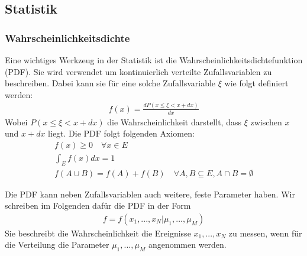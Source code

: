 \subsection{Statistik}
\subsubsection{Wahrscheinlichkeitsdichte}
Eine wichtiges Werkzeug in der Statistik ist die Wahrscheinlichkeitsdichtefunktion (PDF).
Sie wird verwendet um kontinuierlich verteilte Zufallsvariablen zu beschreiben.
Dabei kann sie für eine solche Zufallsvariable $\xi$ wie folgt definiert werden:
\begin{gather}
	f(x) = \frac{dP\left (x\leq \xi <x+dx\right )}{dx}
\end{gather}
Wobei $P\left (x\leq \xi <x+dx\right )$ die Wahrscheinlichkeit darstellt, dass $\xi$ zwischen $x$ und $x+dx$ liegt.
Die PDF folgt folgenden Axiomen:
\begin{gather}
	f(x) \geq 0 \quad \forall	x \in E \\
	\int_{E} f(x)dx = 1 \\
	f(A \cup B) = f(A) + f(B) \quad \forall A,B \subseteq E, A \cap B = \emptyset
\end{gather}

Die PDF kann neben Zufallsvariablen auch weitere, feste Parameter haben.
Wir schreiben im Folgenden dafür die PDF in der Form
\begin{gather}
	f = f(x_{1},...,x_{N}|\mu_{1},...,\mu_{M})
\end{gather}
Sie beschreibt die Wahrscheinlichkeit die Ereignisse $x_{1},...,x_{N}$ zu messen, wenn für die Verteilung die Parameter $\mu_{1},...,\mu_{M}$ angenommen werden.

